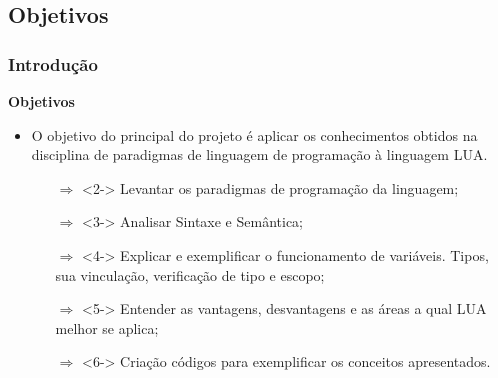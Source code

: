 ﻿\documentclass{beamer}
\begin{document}
\subsection{Objetivos}
\begin{frame}[fragile]
\frametitle{Introdução}
{\bf Objetivos}\vspace{0.4cm}
\begin{itemize}
\item<1-> O objetivo do principal do projeto é aplicar os conhecimentos obtidos na disciplina de paradigmas de linguagem de programação à linguagem LUA.
\begin{itemize}
\item[$\Rightarrow$]<2-> Levantar os paradigmas de programação da linguagem;
\item[$\Rightarrow$]<3-> Analisar Sintaxe e Semântica;
\item[$\Rightarrow$]<4-> Explicar e exemplificar o funcionamento de variáveis. Tipos, sua vinculação, verificação de tipo e escopo;
\item[$\Rightarrow$]<5-> Entender as vantagens, desvantagens e as áreas a qual LUA melhor se aplica;
\item[$\Rightarrow$]<6-> Criação códigos para exemplificar os conceitos apresentados.
\end{itemize}
\end{itemize}
\end{frame}
\end{document}
